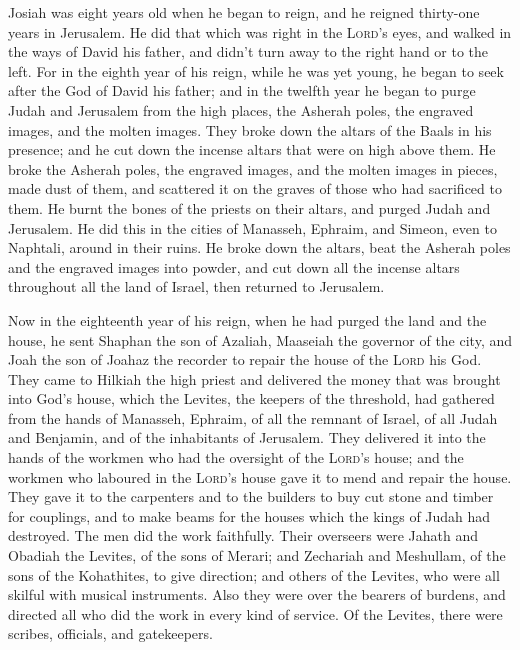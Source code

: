  Josiah was eight years old when he began to reign, and he
reigned thirty-one years in Jerusalem.  He did that which
was right in the \textsc{Lord}'s eyes, and walked in the ways of David
his father, and didn't turn away to the right hand or to the left.
 For in the eighth year of his reign, while he was yet
young, he began to seek after the God of David his father; and in the
twelfth year he began to purge Judah and Jerusalem from the high places,
the Asherah poles, the engraved images, and the molten images.
 They broke down the altars of the Baals in his presence;
and he cut down the incense altars that were on high above them. He
broke the Asherah poles, the engraved images, and the molten images in
pieces, made dust of them, and scattered it on the graves of those who
had sacrificed to them.  He burnt the bones of the priests
on their altars, and purged Judah and Jerusalem.  He did
this in the cities of Manasseh, Ephraim, and Simeon, even to Naphtali,
around in their ruins.  He broke down the altars, beat the
Asherah poles and the engraved images into powder, and cut down all the
incense altars throughout all the land of Israel, then returned to
Jerusalem.

 Now in the eighteenth year of his reign, when he had
purged the land and the house, he sent Shaphan the son of Azaliah,
Maaseiah the governor of the city, and Joah the son of Joahaz the
recorder to repair the house of the \textsc{Lord} his God.
 They came to Hilkiah the high priest and delivered the
money that was brought into God's house, which the Levites, the keepers
of the threshold, had gathered from the hands of Manasseh, Ephraim, of
all the remnant of Israel, of all Judah and Benjamin, and of the
inhabitants of Jerusalem.  They delivered it into the
hands of the workmen who had the oversight of the \textsc{Lord}'s house;
and the workmen who laboured in the \textsc{Lord}'s house gave it to
mend and repair the house.  They gave it to the
carpenters and to the builders to buy cut stone and timber for
couplings, and to make beams for the houses which the kings of Judah had
destroyed.  The men did the work faithfully. Their
overseers were Jahath and Obadiah the Levites, of the sons of Merari;
and Zechariah and Meshullam, of the sons of the Kohathites, to give
direction; and others of the Levites, who were all skilful with musical
instruments.  Also they were over the bearers of burdens,
and directed all who did the work in every kind of service. Of the
Levites, there were scribes, officials, and gatekeepers.

